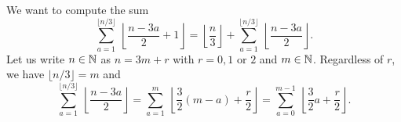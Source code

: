         We want to compute the sum
        \begin{equation}
            \sum^{\lfloor n/3\rfloor}_{a=1}~\left\lfloor \frac{n-3a}{2}+1\right\rfloor = \left\lfloor \frac{n}{3}\right\rfloor + \sum^{\lfloor n/3\rfloor}_{a=1}~\left\lfloor \frac{n-3a}{2}\right\rfloor.
        \end{equation}
        Let us write $n\in\mathbb{N}$ as $n=3m+r$ with $r=0,1$ or $2$ and $m\in\mathbb{N}$. Regardless of $r$, we have $\lfloor n/3\rfloor=m$ and
        \begin{equation}
            \sum^{\lfloor n/3\rfloor}_{a=1}~\left\lfloor \frac{n-3a}{2}\right\rfloor = \sum^{m}_{a=1}~\left\lfloor \frac{3}{2}(m-a)+\frac{r}{2}\right\rfloor = \sum^{m-1}_{a=0}~\left\lfloor \frac{3}{2}a+\frac{r}{2}\right\rfloor.\label{eq:sumfloor}
        \end{equation}
